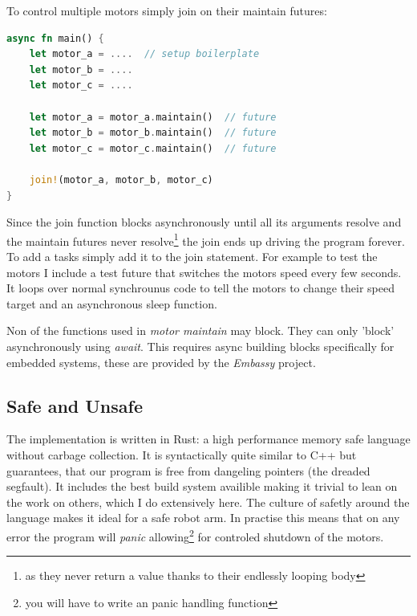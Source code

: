 \documentclass[lang=en, hanging-titles=true]{skrapport}
\begin{document}
To control multiple motors simply join on their maintain futures: 
\begin{minipage}{\linewidth} %
\begin{lstlisting}[language=rust, style=boxed, tabsize=2]
async fn main() {
	let motor_a = ....  // setup boilerplate
	let motor_b = ....
	let motor_c = ....

	let motor_a = motor_a.maintain()  // future
	let motor_b = motor_b.maintain()  // future
	let motor_c = motor_c.maintain()  // future

	join!(motor_a, motor_b, motor_c)
}
\end{lstlisting}
\end{minipage}
%
Since the join function blocks asynchronously until all its arguments resolve and the maintain futures never resolve\footnote{as they never return a value thanks to their endlessly looping body} the join ends up driving the program forever. To add a tasks simply add it to the join statement. For example to test the motors I include a test future that switches the motors speed every few seconds. It loops over normal synchrounus code to tell the motors to change their speed target and an asynchronous sleep function.

Non of the functions used in \textit{motor maintain} may block. They can only 'block' asynchronously using \textit{await}. This requires async building blocks specifically for embedded systems, these are provided by the \textit{Embassy}\cite{embassy} project.

\subsection{Safe and Unsafe}
The implementation is written in Rust: a high performance memory safe language without carbage collection. It is syntactically quite similar to C++ but guarantees, that our program is free from dangeling pointers (the dreaded segfault). It includes the best build system availible making it trivial to lean on the work on others, which I do extensively here. The culture of safetly around the language makes it ideal for a safe robot arm. In practise this means that on any error the program will \textit{panic} allowing\footnote{you will have to write an panic handling function} for controled shutdown of the motors.
\end{document}
